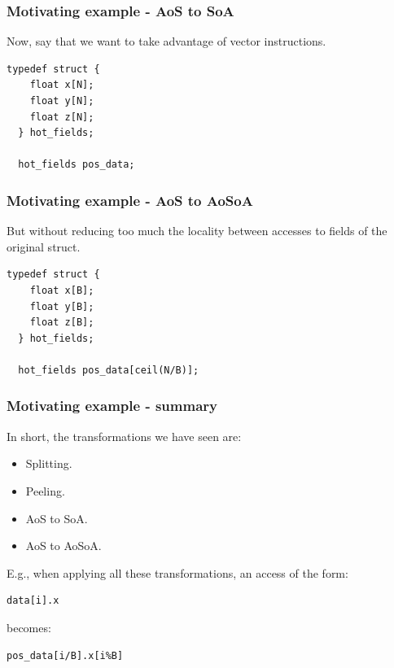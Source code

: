 \begin{frame}[fragile]
\frametitle{Motivating example - AoS to SoA}

Now, say that we want to take advantage of vector instructions.

\bigskip

\begin{lstlisting}[style=Cstyle]
  typedef struct {
    float x[N];
    float y[N];
    float z[N];
  } hot_fields;

  hot_fields pos_data;
\end{lstlisting}

\end{frame}


\begin{frame}[fragile]
\frametitle{Motivating example - AoS to AoSoA}

But without reducing too much the locality between accesses to fields of the original struct.

\bigskip

\begin{lstlisting}[style=Cstyle]
  typedef struct {
    float x[B];
    float y[B];
    float z[B];
  } hot_fields;

  hot_fields pos_data[ceil(N/B)];
\end{lstlisting}

\end{frame}


\begin{frame}[fragile]
\frametitle{Motivating example - summary}

In short, the transformations we have seen are:
\begin{itemize}
	\item Splitting.
	\item Peeling.
	\item AoS to SoA.
	\item AoS to AoSoA.
\end{itemize}

\bigskip \pause

E.g., when applying all these transformations, an access of the form:

\begin{lstlisting}[style=Cstyle]
  data[i].x
\end{lstlisting}

becomes:

\begin{lstlisting}[style=Cstyle]
  pos_data[i/B].x[i%B]
\end{lstlisting}

\end{frame}



